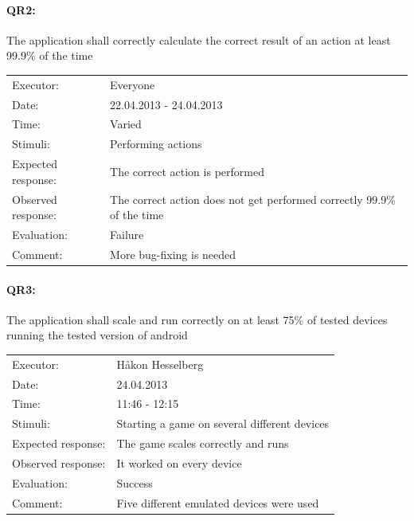 \documentclass[12pt, a4paper]{article}
\begin{document}
\paragraph{QR2:} The application shall correctly calculate the correct result of an
action at least 99.9\% of the time \\
\begin{tabular}{  p{}  p{} }
    Executor: & Everyone \\
    Date: & 22.04.2013 - 24.04.2013 \\
    Time: & Varied \\
    Stimuli: & Performing actions \\
    Expected response: & The correct action is performed \\
    Observed response: & The correct action does not get performed correctly 99.9\% of the time \\
    Evaluation: & Failure \\
    Comment: & More bug-fixing is needed \\
\end{tabular}

\paragraph{QR3:} The application shall scale and run correctly on at least 75\% of
tested devices running the tested version of android\\
\begin{tabular}{  p{}  p{} }
    Executor: & Håkon Hesselberg \\
    Date: & 24.04.2013 \\
    Time: & 11:46 - 12:15 \\
    Stimuli: & Starting a game on several different devices \\
    Expected response: & The game scales correctly and runs \\
    Observed response: & It worked on every device \\
    Evaluation: & Success \\
    Comment: & Five different emulated devices were used \\
\end{tabular}
\end{document}
